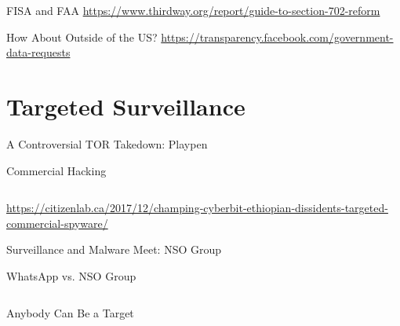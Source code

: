 \documentclass[nobackground,dvipsnames,table]{beamer}
\begin{document}
\begin{frame}{FISA and FAA}
    \tiny
    \url{https://www.thirdway.org/report/guide-to-section-702-reform}
\end{frame}

\begin{frame}{How About Outside of the US?}
    \tiny
    \url{https://transparency.facebook.com/government-data-requests}
\end{frame}

\section{Targeted Surveillance}

\begin{frame}{A Controversial TOR Takedown: Playpen}
\end{frame}

\begin{frame}{Commercial Hacking}
    \begin{columns}
    \end{columns}
    \tiny
    \url{https://citizenlab.ca/2017/12/champing-cyberbit-ethiopian-dissidents-targeted-commercial-spyware/}
\end{frame}

\begin{frame}{Surveillance and Malware Meet: NSO Group}
\end{frame}

\begin{frame}{WhatsApp vs. NSO Group}
    \begin{columns}
    \end{columns}
\end{frame}

\begin{frame}{Anybody Can Be a Target}
    \begin{columns}
    \end{columns}
\end{frame}
\end{document}
